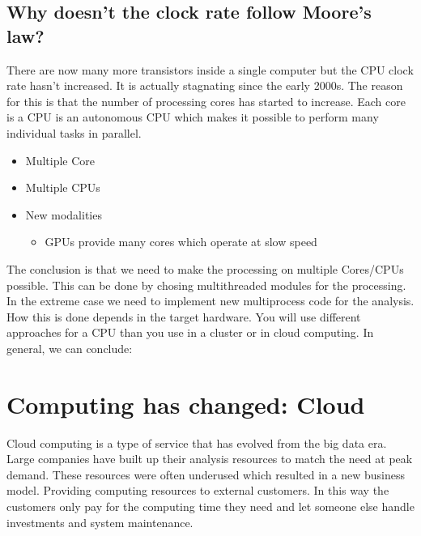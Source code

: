 \documentclass[letterpaper,10pt,english]{sphinxmanual}
\begin{document}
\subsection{Why doesn’t the clock rate follow Moore’s law?}
\label{\detokenize{01-Introduction:why-doesn-t-the-clock-rate-follow-moore-s-law}}
\sphinxAtStartPar
There are now many more transistors inside a single computer but the CPU clock rate hasn’t increased. It is actually stagnating since the early 2000s. The reason for this is that the number of processing cores has started to increase. Each core is a CPU is an autonomous CPU which makes it possible to perform many individual tasks in parallel.
\begin{itemize}
\item {} 
\sphinxAtStartPar
Multiple Core

\item {} 
\sphinxAtStartPar
Multiple CPUs

\item {} 
\sphinxAtStartPar
New modalities
\begin{itemize}
\item {} 
\sphinxAtStartPar
GPUs provide many cores which operate at slow speed

\end{itemize}

\end{itemize}

\sphinxAtStartPar
The conclusion is that we need to make the processing on multiple Cores/CPUs possible. This can be done by chosing multithreaded modules for the processing. In the extreme case we need to implement new multi\sphinxhyphen{}process code for the analysis. How this is done depends in the target hardware. You will use different approaches for a CPU than you use in a cluster or in cloud computing. In general, we can conclude:

\sphinxAtStartPar
{}


\section{Computing has changed: Cloud}
\label{\detokenize{01-Introduction:computing-has-changed-cloud}}
\sphinxAtStartPar
Cloud computing is a type of service that has evolved from the big data era. Large companies have built up their analysis resources to match the need at peak demand. These resources were often underused which resulted in a new business model. Providing computing resources to external customers. In this way the customers only pay for the computing time they need and let someone else handle investments and system maintenance.
\end{document}
